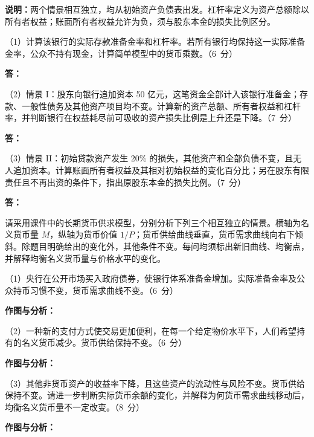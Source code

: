 \documentclass[UTF8,11pt,a4paper,fontset=fandol]{ctexart}
\newcommand{\sect}[1]{\par\vspace{0.7em}{\large\bfseries #1}\par\vspace{0.6em}}
\begin{document}
\textbf{说明：}两个情景相互独立，均从初始资产负债表出发。杠杆率定义为资产总额除以所有者权益；账面所有者权益允许为负，须与股东本金的损失比例区分。

（1）计算该银行的实际存款准备金率和杠杆率。若所有银行均保持这一实际准备金率，公众不持有现金，计算简单模型中的货币乘数。\hfill\mbox{（6 分）}
\par\vspace{0.4em}\textbf{答：}\par\vfill

（2）情景 I：股东向银行追加资本 50 亿元，这笔资金全部计入该银行准备金；存款、一般性债务及其他资产项目均不变。计算新的资产总额、所有者权益和杠杆率，并判断银行在权益耗尽前可吸收的资产损失比例是上升还是下降。\hfill\mbox{（7 分）}
\par\vspace{0.4em}\textbf{答：}\par\vfill

（3）情景 II：初始贷款资产发生 20\% 的损失，其他资产和全部负债不变，且无人追加资本。计算账面所有者权益及其相对初始权益的变化百分比；另在股东有限责任且不再出资的条件下，指出原股东本金的损失比例。\hfill\mbox{（7 分）}
\par\vspace{0.4em}\textbf{答：}\par\vfill
\newpage\sect{四、作图分析题（1 题，共 20 分）}
请采用课件中的长期货币供求模型，分别分析下列三个相互独立的情景。横轴为名义货币量 $M$，纵轴为货币价值 $1/P$；货币供给曲线垂直，货币需求曲线向右下倾斜。除题目明确给出的变化外，其他条件不变。每问均须标出新旧曲线、均衡点，并解释均衡名义货币量与价格水平的变化。

（1）央行在公开市场买入政府债券，使银行体系准备金增加。实际准备金率及公众持币习惯不变，货币需求曲线不变。\hfill\mbox{（6 分）}
\par\vspace{0.5em}\textbf{作图与分析：}\par\vfill

（2）一种新的支付方式使交易更加便利，在每一个给定物价水平下，人们希望持有的名义货币减少。货币供给保持不变。\hfill\mbox{（6 分）}
\par\vspace{0.5em}\textbf{作图与分析：}\par\vfill

（3）其他非货币资产的收益率下降，且这些资产的流动性与风险不变。货币供给保持不变。请进一步判断实际货币余额的变化，并解释为何货币需求曲线移动后，均衡名义货币量不一定改变。\hfill\mbox{（8 分）}
\par\vspace{0.5em}\textbf{作图与分析：}\par\vfill
\end{document}
